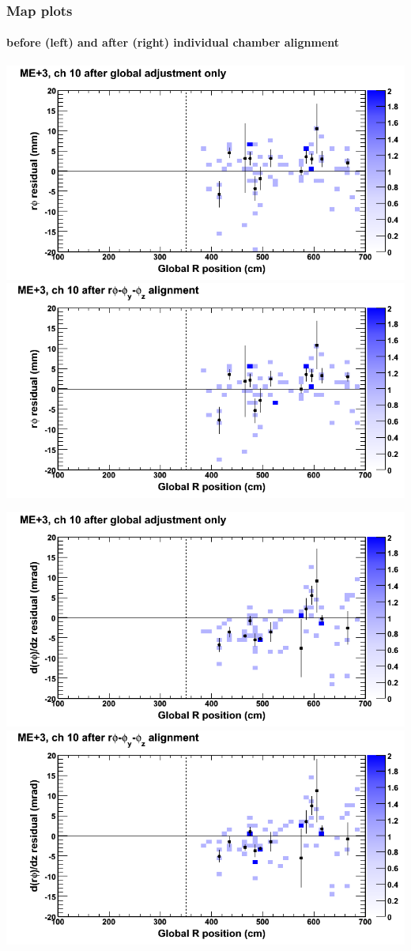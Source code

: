 \documentclass[compress]{beamer}
\begin{document}
\begin{frame}
\frametitle{Map plots}
\framesubtitle{before (left) and after (right) individual chamber alignment}
\includegraphics[width=0.5\linewidth]{ringmapplots_3dof/before_CSCvsr_mep3ch10_x.png} \includegraphics[width=0.5\linewidth]{ringmapplots_3dof/after_CSCvsr_mep3ch10_x.png}

\includegraphics[width=0.5\linewidth]{ringmapplots_3dof/before_CSCvsr_mep3ch10_dxdz.png} \includegraphics[width=0.5\linewidth]{ringmapplots_3dof/after_CSCvsr_mep3ch10_dxdz.png}
\end{frame}
\end{document}
